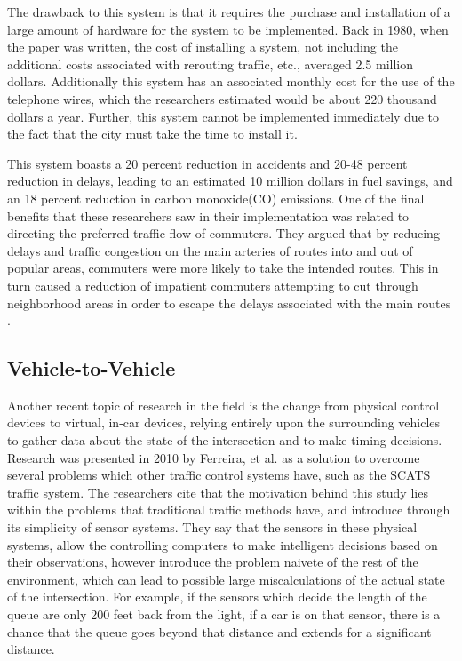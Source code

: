 The drawback to this system is that it requires the purchase and installation of a large amount of hardware for the system to be implemented.  Back in 1980, when the paper was written, the cost of installing a system, not including the additional costs associated with rerouting traffic, etc., averaged 2.5 million dollars.  Additionally this system has an associated monthly cost for the use of the telephone wires, which the researchers estimated would be about  220 thousand dollars a year.  Further,  this system cannot be implemented immediately due to the fact that the city must take the time to install it\cite{SCATS}. 

This system boasts a 20 percent reduction in accidents and 20-48 percent reduction in delays, leading to an estimated 10 million dollars in fuel savings, and an 18 percent reduction in carbon monoxide(CO) emissions.  One of the final benefits that these researchers saw in their implementation was related to directing the preferred traffic flow of commuters.  They argued that by reducing delays and traffic congestion on the main arteries of routes into and out of popular areas, commuters were more likely to take the intended routes.  This in turn caused a reduction of impatient commuters attempting to cut through neighborhood areas in order to escape the delays associated with the main routes \cite{SCATS}.
	
\subsection{Vehicle-to-Vehicle}
Another recent topic of research in the field is the change from physical control devices to virtual, in-car devices, relying entirely upon the surrounding vehicles to gather data about the state of the intersection and to make timing decisions.  Research was presented in 2010 by Ferreira, et al.\cite{V2V} as a solution to overcome several problems which other traffic control systems have, such as the SCATS traffic system.  The researchers cite that the motivation behind this study lies within the problems that traditional traffic methods have, and introduce through its simplicity of sensor systems.  They say that the sensors in these physical systems, allow the controlling computers to make intelligent decisions based on their observations, however introduce the problem naivete of the rest of the environment, which can lead to possible large miscalculations of the actual state of the intersection.  For example, if the sensors which decide the length of the queue are only 200 feet back from the light, if a car is on that sensor, there is a chance that the queue goes beyond that distance and extends for a significant distance\cite{V2V}.  

